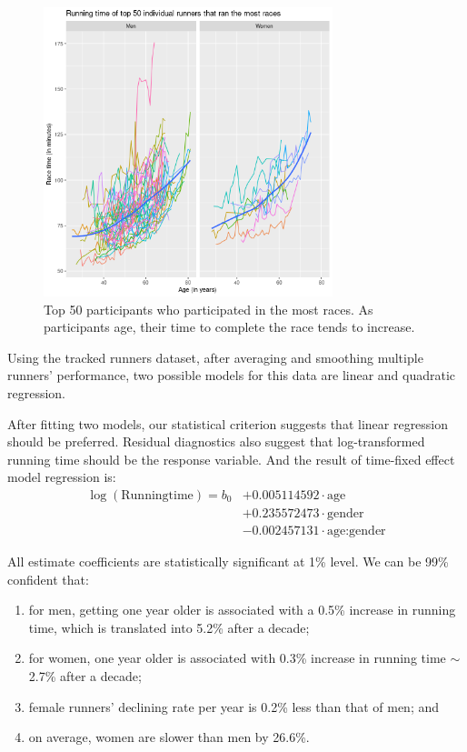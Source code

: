 \documentclass[12pt]{article}
\begin{document}
\begin{figure}[ht]
	\centering
	\includegraphics[width = 0.75\textwidth]
	{../figure/overview_tracked_runners-4.png}
	\caption{
		Top 50 participants who participated in the most races.
		As participants age, their time to complete the race
		tends to increase.
	}
	\label{tracked-runners-smooth}
\end{figure}

Using the tracked runners dataset, after averaging and smoothing multiple
runners' performance, two possible models for this data are linear and
quadratic regression.

After fitting two models, our statistical criterion suggests that linear
regression should be preferred.
Residual diagnostics also suggest that log-transformed running time should
be the response variable.
And the result of time-fixed effect model regression is:
\begin{align*}
	\log(\text{Runningtime})
	= b_0 &+ 0.005114592 \cdot \text{age}
	\\&
	+ 0.235572473 \cdot \text{gender}
	\\&
	- 0.002457131 \cdot \text{age:gender}
\end{align*}


All estimate coefficients are statistically significant at 1\% level.
We can be 99\% confident that:
\begin{enumerate}[label=(\roman*)]
	\item for men, getting one year older is associated with a 0.5\%
		increase in running time, which is translated into 5.2\% after a decade;
	\item for women, one year older is associated with 0.3\% increase in
		running time $\sim$ 2.7\% after a decade;
	\item female runners' declining rate per year is 0.2\% less than that of
		men; and
	\item on average, women are slower than men by 26.6\%.
\end{enumerate}
\end{document}
